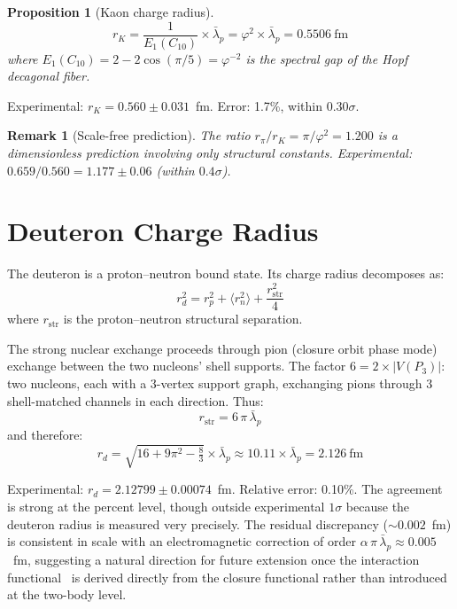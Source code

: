 \documentclass[12pt]{article}
\newtheorem{proposition}[theorem]{Proposition}
\newtheorem{remark}[theorem]{Remark}
\newcommand{\phig}{\varphi}
\newcommand{\lbar}{\bar{\lambda}}
\begin{document}
\begin{proposition}[Kaon charge radius]\label{prop:kaon}
\begin{equation}\label{eq:kaon}
    r_K = \frac{1}{E_1(C_{10})} \times \lbar_p = \phig^2 \times \lbar_p = 0.5506~\text{fm}
\end{equation}
where $E_1(C_{10}) = 2 - 2\cos(\pi/5) = \phig^{-2}$ is the spectral gap of the Hopf decagonal fiber.
\end{proposition}

\noindent Experimental: $r_K = 0.560 \pm 0.031$~fm. Error: 1.7\%, within 0.30$\sigma$.

\begin{remark}[Scale-free prediction]
The ratio $r_\pi/r_K = \pi/\phig^2 = 1.200$ is a dimensionless prediction involving only structural constants. Experimental: $0.659/0.560 = 1.177 \pm 0.06$ (within $0.4\sigma$).
\end{remark}

\section{Deuteron Charge Radius}\label{sec:deuteron}

The deuteron is a proton--neutron bound state. Its charge radius decomposes as:
\begin{equation}\label{eq:deuteron}
    r_d^2 = r_p^2 + \langle r_n^2 \rangle + \frac{r_{\mathrm{str}}^2}{4}
\end{equation}
where $r_{\mathrm{str}}$ is the proton--neutron structural separation.

The strong nuclear exchange proceeds through pion (closure orbit phase mode) exchange between the two nucleons' shell supports. The factor $6 = 2 \times |V(P_3)|$: two nucleons, each with a 3-vertex support graph, exchanging pions through 3 shell-matched channels in each direction. Thus:
\begin{equation}
    r_{\mathrm{str}} = 6\,\pi\,\lbar_p
\end{equation}
and therefore:
\begin{equation}
    r_d = \sqrt{16 + 9\pi^2 - \tfrac{8}{3}} \times \lbar_p \approx 10.11 \times \lbar_p = 2.126~\text{fm}
\end{equation}

\noindent Experimental: $r_d = 2.12799 \pm 0.00074$~fm. Relative error: 0.10\%. The agreement is strong at the percent level, though outside experimental $1\sigma$ because the deuteron radius is measured very precisely. The residual discrepancy ($\sim\!0.002$~fm) is consistent in scale with an electromagnetic correction of order $\alpha\,\pi\,\lbar_p \approx 0.005$~fm, suggesting a natural direction for future extension once the interaction functional~\citep{SmartXIII} is derived directly from the closure functional rather than introduced at the two-body level.
\end{document}
